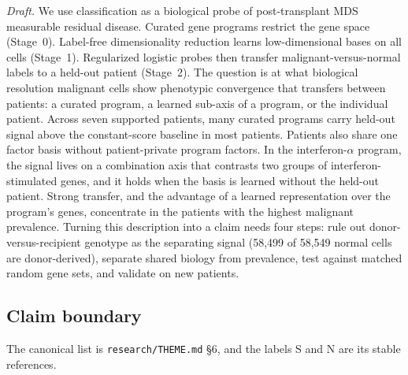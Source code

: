 \emph{Draft.} We use classification as a biological probe of post-transplant MDS measurable residual disease. Curated gene programs restrict the gene space (Stage~0). Label-free dimensionality reduction learns low-dimensional bases on all cells (Stage~1). Regularized logistic probes then transfer malignant-versus-normal labels to a held-out patient (Stage~2). The question is at what biological resolution malignant cells show phenotypic convergence that transfers between patients: a curated program, a learned sub-axis of a program, or the individual patient. Across seven supported patients, many curated programs carry held-out signal above the constant-score baseline in most patients. Patients also share one factor basis without patient-private program factors. In the interferon-$\alpha$ program, the signal lives on a combination axis that contrasts two groups of interferon-stimulated genes, and it holds when the basis is learned without the held-out patient. Strong transfer, and the advantage of a learned representation over the program's genes, concentrate in the patients with the highest malignant prevalence. Turning this description into a claim needs four steps: rule out donor-versus-recipient genotype as the separating signal (58,499 of 58,549 normal cells are donor-derived), separate shared biology from prevalence, test against matched random gene sets, and validate on new patients.

\subsection{Claim boundary}

The canonical list is \texttt{research/THEME.md} \S6, and the labels S and N are its stable references.

